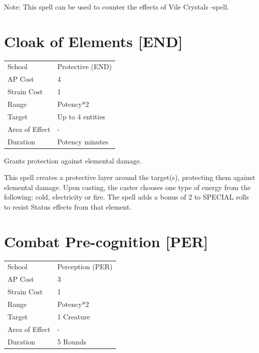 \documentclass[11pt,a4paper,twocolumn]{book}
\begin{document}
Note: This spell can be used to counter the effects of Vile Crystals -spell.


\section*{Cloak of Elements [END]}
{
	\begin{tabu} to 75mm{| X[l,4] | X[l,7] |}
		\hline
		School 			& Protective (END) 		\\
        AP Cost	      	& 4 					\\
        Strain Cost     & 1 					\\
        Range     		& Potency*2 			\\
        Target      	& Up to 4 entities 		\\
        Area of Effect  & - 	 				\\
        Duration     	& Potency minutes 		\\ \hline
	\end{tabu}
		
}

\medskip

Grants protection against elemental damage.

This spell creates a protective layer around the target(s), protecting them against elemental damage. Upon casting, the caster chooses one type of energy from the following: cold, electricity or fire. The spell adds a bonus of 2 to SPECIAL rolls to resist Status effects from that element.

\vfill


\section*{Combat Pre-cognition [PER]} 
{
	\begin{tabu} to 75mm{| X[l,4] | X[l,7] |}
		\hline
		School 			& Perception (PER) \\
        AP Cost	      	& 3 					\\
        Strain Cost     & 1 					\\
        Range     		& Potency*2 			\\
        Target      	& 1 Creature 			\\
        Area of Effect  & - 	 				\\
        Duration     	& 5 Rounds 			\\ \hline
	\end{tabu}
		
}
\end{document}
